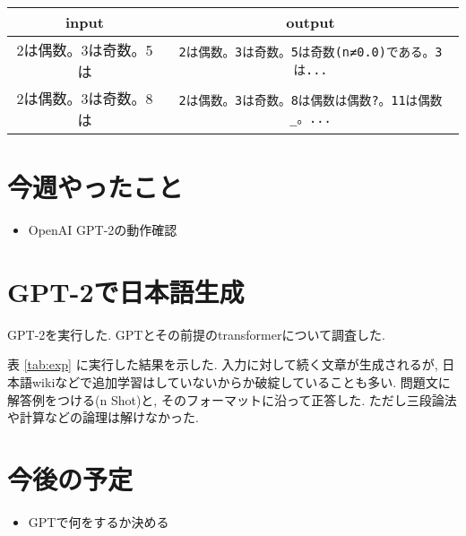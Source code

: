 \documentclass[twocolumn]{jarticle}     %
\begin{document}


  \begin{table*}[tb]
    \begin{center}
      \caption{GPT-2の動作例}
      \begin{tabular}{|c|c|} \hline
        input & output \\ \hline
        2は偶数。3は奇数。5は & \verb|2は偶数。3は奇数。5は奇数(n≠0.0)である。3は...| \\ \hline
        2は偶数。3は奇数。8は & \verb|2は偶数。3は奇数。8は偶数は偶数?。11は偶数_。...|\\ \hline
      \end{tabular}
      \label{tab:exp}
    \end{center}
  \end{table*}

\section{今週やったこと}
\begin{itemize}
  \item OpenAI GPT-2の動作確認
\end{itemize}

\section{GPT-2で日本語生成}
GPT-2\cite{radford2019language}を実行した.
GPTとその前提のtransformer\cite{DBLP:journals/corr/VaswaniSPUJGKP17}について調査した.

表 \ref{tab:exp} に実行した結果を示した.
入力に対して続く文章が生成されるが, 日本語wikiなどで追加学習はしていないからか破綻していることも多い.
問題文に解答例をつける(n Shot)と, そのフォーマットに沿って正答した.
ただし三段論法や計算などの論理は解けなかった.


\section{今後の予定}
\begin{itemize}
  \item GPTで何をするか決める
\end{itemize}



\end{document}
